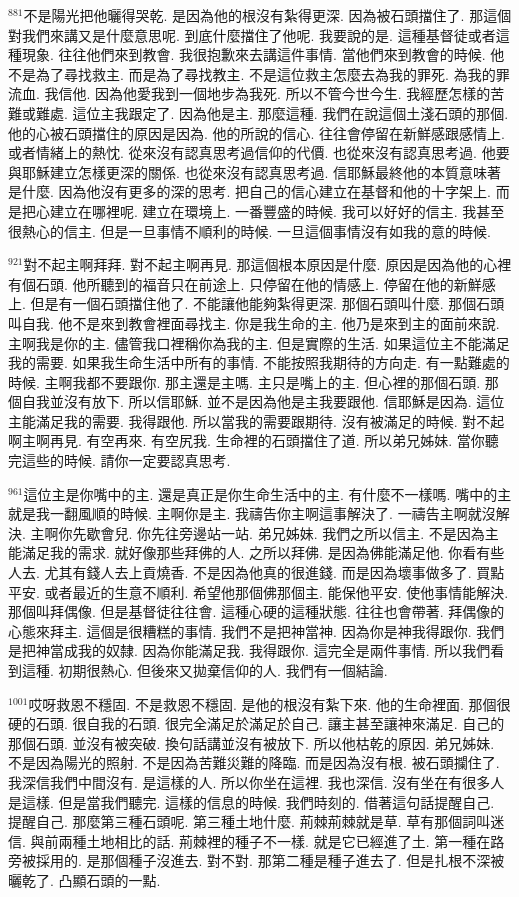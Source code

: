 \documentclass{book}
\begin{document}
$^{881}$不是陽光把他曬得哭乾.
是因為他的根沒有紮得更深.
因為被石頭擋住了.
那這個對我們來講又是什麼意思呢.
到底什麼擋住了他呢.
我要說的是.
這種基督徒或者這種現象.
往往他們來到教會.
我很抱歉來去講這件事情.
當他們來到教會的時候.
他不是為了尋找救主.
而是為了尋找教主.
不是這位救主怎麼去為我的罪死.
為我的罪流血.
我信他.
因為他愛我到一個地步為我死.
所以不管今世今生.
我經歷怎樣的苦難或難處.
這位主我跟定了.
因為他是主.
那麼這種.
我們在說這個土淺石頭的那個.
他的心被石頭擋住的原因是因為.
他的所說的信心.
往往會停留在新鮮感跟感情上.
或者情緒上的熱忱.
從來沒有認真思考過信仰的代價.
也從來沒有認真思考過.
他要與耶穌建立怎樣更深的關係.
也從來沒有認真思考過.
信耶穌最終他的本質意味著是什麼.
因為他沒有更多的深的思考.
把自己的信心建立在基督和他的十字架上.
而是把心建立在哪裡呢.
建立在環境上.
一番豐盛的時候.
我可以好好的信主.
我甚至很熱心的信主.
但是一旦事情不順利的時候.
一旦這個事情沒有如我的意的時候.

$^{921}$對不起主啊拜拜.
對不起主啊再見.
那這個根本原因是什麼.
原因是因為他的心裡有個石頭.
他所聽到的福音只在前途上.
只停留在他的情感上.
停留在他的新鮮感上.
但是有一個石頭擋住他了.
不能讓他能夠紮得更深.
那個石頭叫什麼.
那個石頭叫自我.
他不是來到教會裡面尋找主.
你是我生命的主.
他乃是來到主的面前來說.
主啊我是你的主.
儘管我口裡稱你為我的主.
但是實際的生活.
如果這位主不能滿足我的需要.
如果我生命生活中所有的事情.
不能按照我期待的方向走.
有一點難處的時候.
主啊我都不要跟你.
那主還是主嗎.
主只是嘴上的主.
但心裡的那個石頭.
那個自我並沒有放下.
所以信耶穌.
並不是因為他是主我要跟他.
信耶穌是因為.
這位主能滿足我的需要.
我得跟他.
所以當我的需要跟期待.
沒有被滿足的時候.
對不起啊主啊再見.
有空再來.
有空尻我.
生命裡的石頭擋住了道.
所以弟兄姊妹.
當你聽完這些的時候.
請你一定要認真思考.

$^{961}$這位主是你嘴中的主.
還是真正是你生命生活中的主.
有什麼不一樣嗎.
嘴中的主就是我一翻風順的時候.
主啊你是主.
我禱告你主啊這事解決了.
一禱告主啊就沒解決.
主啊你先歇會兒.
你先往旁邊站一站.
弟兄姊妹.
我們之所以信主.
不是因為主能滿足我的需求.
就好像那些拜佛的人.
之所以拜佛.
是因為佛能滿足他.
你看有些人去.
尤其有錢人去上貢燒香.
不是因為他真的很進錢.
而是因為壞事做多了.
買點平安.
或者最近的生意不順利.
希望他那個佛那個主.
能保他平安.
使他事情能解決.
那個叫拜偶像.
但是基督徒往往會.
這種心硬的這種狀態.
往往也會帶著.
拜偶像的心態來拜主.
這個是很糟糕的事情.
我們不是把神當神.
因為你是神我得跟你.
我們是把神當成我的奴隸.
因為你能滿足我.
我得跟你.
這完全是兩件事情.
所以我們看到這種.
初期很熱心.
但後來又拋棄信仰的人.
我們有一個結論.

$^{1001}$哎呀救恩不穩固.
不是救恩不穩固.
是他的根沒有紮下來.
他的生命裡面.
那個很硬的石頭.
很自我的石頭.
很完全滿足於滿足於自己.
讓主甚至讓神來滿足.
自己的那個石頭.
並沒有被突破.
換句話講並沒有被放下.
所以他枯乾的原因.
弟兄姊妹.
不是因為陽光的照射.
不是因為苦難災難的降臨.
而是因為沒有根.
被石頭攔住了.
我深信我們中間沒有.
是這樣的人.
所以你坐在這裡.
我也深信.
沒有坐在有很多人是這樣.
但是當我們聽完.
這樣的信息的時候.
我們時刻的.
借著這句話提醒自己.
提醒自己.
那麼第三種石頭呢.
第三種土地什麼.
荊棘荊棘就是草.
草有那個詞叫迷信.
與前兩種土地相比的話.
荊棘裡的種子不一樣.
就是它已經進了土.
第一種在路旁被採用的.
是那個種子沒進去.
對不對.
那第二種是種子進去了.
但是扎根不深被曬乾了.
凸顯石頭的一點.
\end{document}
